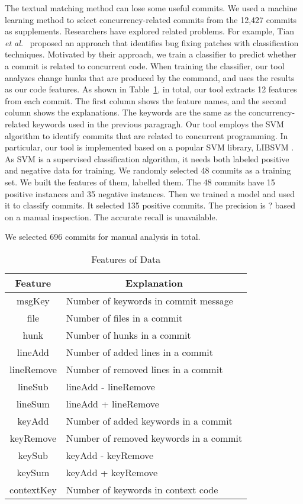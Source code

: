 The textual matching method can lose some useful commits. We used a machine learning method to select concurrency-related commits from the 12,427 commits as supplements. Researchers have explored related problems. For example, Tian \emph{et al.}~\cite{tian2012identifying} proposed an approach that identifies bug fixing patches with classification techniques. Motivated by their approach, we train a classifier to predict whether a commit is related to concurrent code. When training the classifier, our tool analyzes change hunks that are produced by the  command, and uses the results as our code features. As shown in Table~\ref{table:feature}, in total, our tool extracts 12 features from each commit. The first column shows the feature names, and the second column shows the explanations. The keywords are the same as the concurrency-related keywords used in the previous paragragh. Our tool employs the SVM \cite{journals/ml/CortesV95} algorithm to identify commits that are related to concurrent programming. In particular, our tool is implemented based on a popular SVM library, LIBSVM \cite{libsvm}. As SVM is a supervised classification algorithm, it needs both labeled positive and negative data for training. We randomly selected 48 commits as a training set. We built the features of them, labelled them. The 48 commits have 15 positive instances and 35 negative instances. Then we trained a model and used it to classify commits. It selected 135 positive commits. The precision is ? based on a manual inspection. The accurate recall is unavailable.

We selected 696 commits for manual analysis in total.




\begin{table}
	\centering
	\caption{Features of Data}\vspace*{-2ex}
	\label{table:feature}
	\begin{tabular}{|c|l|}\hline
		Feature&\multicolumn{1}{|c|}{Explanation}\\\hline
		msgKey&Number of keywords in commit message\\
		file&Number of files in a commit\\
		hunk&Number of hunks in a commit\\
		lineAdd&Number of added lines in a commit\\
		lineRemove&Number of removed lines in a commit\\
		lineSub&lineAdd - lineRemove\\
		lineSum&lineAdd + lineRemove\\
		keyAdd&Number of added keywords in a commit\\
		keyRemove&Number of removed keywords in a commit\\
		keySub&keyAdd - keyRemove\\
		keySum&keyAdd + keyRemove\\
		contextKey&Number of keywords in context code\\\hline
	\end{tabular}\vspace*{-3ex}
\end{table}

